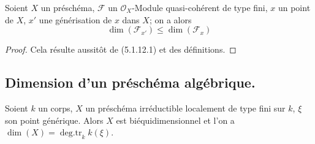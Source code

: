 \begin{proposition}[5.1.13]
\label{IV.2.5.1.13-fr}
Soient $X$ un préschéma, $\mathcal F$ un $\mathcal O_X$-Module
quasi-cohérent de type fini, $x$ un point de $X$, $x'$ une générisation de
$x$ dans $X$; on a alors
\begin{equation}
\dim(\mathcal F_{x'})\leq\dim(\mathcal F_x)
\tag{5.1.13.1}\label{IV.2.5.1.13.1-fr}
\end{equation}
\end{proposition}

\begin{proof}
Cela résulte aussitôt de (5.1.12.1) et des définitions.
\end{proof}

\subsection{Dimension d'un préschéma algébrique.}

\begin{proposition}[5.2.1]
\label{IV.2.5.2.1-fr}
Soient $k$ un corps, $X$ un préschéma irréductible localement de type fini sur
$k$, $\xi$ son point générique. Alors $X$ est biéquidimensionnel et l'on a
$\dim(X)=\operatorname{deg.tr}_k k(\xi)$.
\end{proposition}

